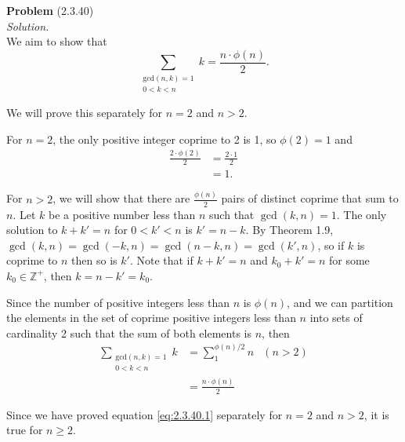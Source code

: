 \documentclass[12 pt]{amsart}
\begin{document}
\phantom{\quad} \vfill
\noindent
\textbf{Problem} (2.3.40) \\[4ex]
\emph{Solution.} \\[2ex]
  We aim to show that 
  \begin{equation}
    \label{eq:2.3.40.1}
    \sum_{
      \substack{
        \text{gcd}(n,k) = 1\\
        0 < k < n
      }
    }
    k
    = \frac{n \cdot \phi(n)}{2}.
  \end{equation}

  We will prove this separately for $n = 2$ and 
  $n > 2$.

  For $n = 2$, the only positive integer 
  coprime to 2 is 1, so $\phi(2) = 1$ and
  \begin{align*}
    \frac{ 2 \cdot \phi(2)}{2} &= \frac{2 \cdot 1}{2} \\
                               &= 1.
  \end{align*}

  For $n > 2$, we will show that there are 
  $\frac{\phi(n)}{2}$ pairs of distinct coprime that sum to
  $n$. 
  Let $k$ be a positive number less than $n$ such that 
  $\gcd(k,n) = 1$. 
  The only solution to $k + k' = n$ for $0 < k' < n$ is
  $k' = n - k$. 
  By Theorem 1.9, 
  $\gcd(k,n) = \gcd(-k,n) = \gcd(n-k,n) = \gcd(k', n)$, so if 
  $k$ is coprime to $n$ then so is $k'$.
  Note that if $k + k' = n$ and $k_0 + k' = n$ for some 
  $k_0 \in \mathbb{Z}^+$, then
  $k = n - k' = k_0$.

  Since the number of positive integers less than $n$ is 
  $\phi(n)$, and we can partition the elements in the set of
  coprime positive integers less than $n$ into sets of 
  cardinality 2 such that the sum of both elements is $n$, 
  then
  \begin{align*}
    \sum_{
      \substack{
        \text{gcd}(n,k) = 1\\
        0 < k < n
      }
    }
    k
    &= 
      \sum_{1}
      ^{\phi(n)/2}
      n & (n > 2)\\
    &=
      \frac{n \cdot \phi(n)}{2}
  \end{align*}

  Since we have proved equation \ref{eq:2.3.40.1} separately
  for $n = 2$ and $n > 2$, it is true for $n \geq 2$.
  
\vfill
\newpage
\end{document}
